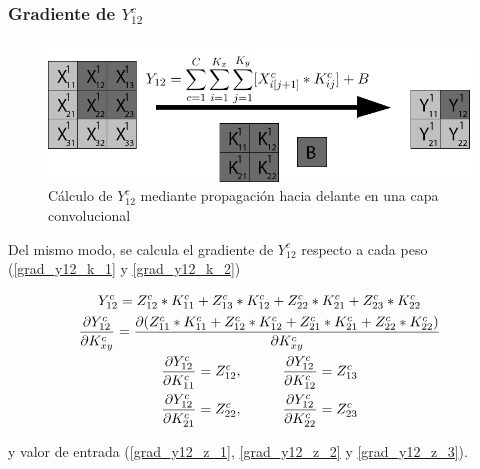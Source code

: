 \subsubsection{Gradiente de $Y^c_{12}$}

\begin{figure}[H]
	\centering
	\includegraphics[width=1\linewidth]{imagenes/conv_ejemplo_backprop_2.jpg} 
	\caption{Cálculo de $Y^c_{12}$ mediante propagación hacia delante en una capa convolucional}
	\label{fig:ejemplo_2_forward_prop_convolucional}
\end{figure}

Del mismo modo, se calcula el gradiente de $Y^c_{12}$ respecto a cada peso (\ref{grad_y12_k_1} y \ref{grad_y12_k_2})

\begin{gather}
	Y^c_{12} = Z^c_{12} * K^c_{11} + Z^c_{13} * K^c_{12} + Z^c_{22} * K^c_{21} + Z^c_{23} * K^c_{22} \\
	\frac{\partial Y^c_{12}}{\partial K^c_{xy}} = \frac{\partial (Z^c_{11} * K^c_{11} + Z^c_{12} * K^c_{12} + Z^c_{21} * K^c_{21} + Z^c_{22} * K^c_{22})}{\partial K^c_{xy}} \\
	\frac{\partial Y^c_{12}}{\partial K^c_{11}} = Z^c_{12}, \hspace{10mm} \frac{\partial Y^c_{12}}{\partial K^c_{12}} = Z^c_{13} \label{grad_y12_k_1} \\
	\frac{\partial Y^c_{12}}{\partial K^c_{21}} = Z^c_{22}, \hspace{10mm} \frac{\partial Y^c_{12}}{\partial K^c_{22}} = Z^c_{23} \label{grad_y12_k_2}
\end{gather}

 y valor de entrada (\ref{grad_y12_z_1}, \ref{grad_y12_z_2} y \ref{grad_y12_z_3}).

